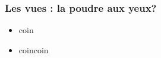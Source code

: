 \speaker{\Mathieu}
\begin{frame}
  \frametitle{Les vues : la poudre aux yeux?}
  \begin{itemize}
    \item coin
    \item coincoin
  \end{itemize}
\end{frame}
